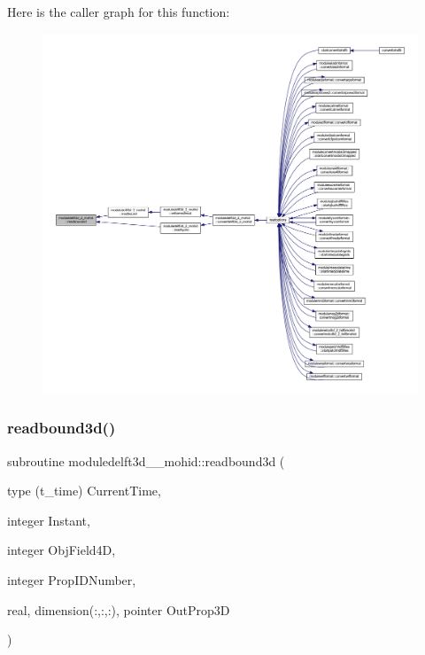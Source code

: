 Here is the caller graph for this function\+:\nopagebreak
\begin{figure}[H]
\begin{center}
\leavevmode
\includegraphics[width=350pt]{namespacemoduledelft3d__2__mohid_ad65093a68569d902890feaaea9871be5_icgraph}
\end{center}
\end{figure}
\mbox{\label{namespacemoduledelft3d__2__mohid_aae94fb67ed2e5ba83ca3fe0d12490cd4}} 
\subsubsection{\texorpdfstring{readbound3d()}{readbound3d()}}
{\footnotesize\ttfamily subroutine moduledelft3d\+\_\+\_\+mohid\+::readbound3d (\begin{DoxyParamCaption}\item[{type (t\+\_\+time)}]{Current\+Time,  }\item[{integer}]{Instant,  }\item[{integer}]{Obj\+Field4D,  }\item[{integer}]{Prop\+I\+D\+Number,  }\item[{real, dimension(\+:,\+:,\+:), pointer}]{Out\+Prop3D }\end{DoxyParamCaption})\hspace{0.3cm}{\ttfamily [private]}}

